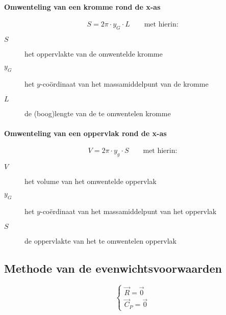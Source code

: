   \paragraph{Omwenteling van een kromme rond de x-as}
  \label{sec:OmwentelingVanEenKrommeRondDeXAs}
    \[
      S = 2 \pi \cdot y_G \cdot L \qquad \mbox{met hierin:}
    \]
    \begin{description}
    	\item[$S$] het oppervlakte van de omwentelde kromme
	    \item[$y_G$] het $y$-coördinaat van het massamiddelpunt van de kromme
    	\item[$L$] de (boog)lengte van de te omwentelen kromme 
    \end{description}
  \paragraph{Omwenteling van een oppervlak rond de x-as}
  \label{sec:OmwentelingVanEenOppervlakRondDeXAs}
    \[
      V = 2 \pi \cdot y_g \cdot S \qquad \mbox{met hierin:}
    \]
    \begin{description}
	    \item[$V$] het volume van het omwentelde oppervlak
	    \item[$y_G$] het $y$-coërdinaat van het massamiddelpunt van het oppervlak
	    \item[$S$] de oppervlakte van het te omwentelen oppervlak 
    \end{description}

\subsection{Methode van de evenwichtsvoorwaarden}
\label{sec:MethodeEvenwichtsvoorwaarden}
\[
  \left\{
    \begin{array}{l}
      \vec{R} = \vec{0} \\
      \vec{C}_P = \vec{0} 
    \end{array}
  \right.
\]
\newpage
